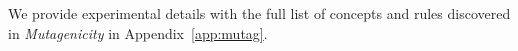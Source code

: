 We provide experimental details with the full list of concepts and rules discovered in \emph{Mutagenicity} in Appendix~\ref{app:mutag}.


